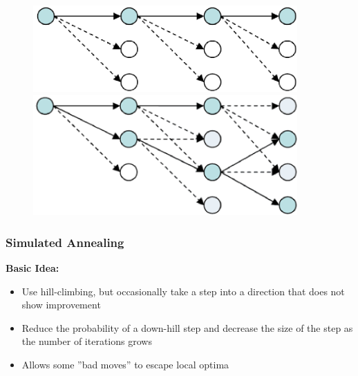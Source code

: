 \documentclass[
../../EiKI_Summary.tex,
]
{subfiles}
\begin{document}
\begin{figure}
    [H]    
    \begin{minipage}
        [t]{0.5\textwidth}
        \centering
        \includegraphics[valign=T,width=0.9\textwidth]{Pics/04/BeamSearchHillClimb.png}
    \end{minipage}
    \begin{minipage}
        [t]{0.5\textwidth}
        \centering
        \includegraphics[valign=T,width=0.9\textwidth]{Pics/04/BeamSearch.png}
    \end{minipage}
\end{figure}

\subsubsection{Simulated Annealing}
\textbf{Basic Idea:}
\begin{itemize}
    \item Use hill-climbing, but occasionally take a step into a direction that does not show improvement
    \item Reduce the probability of a down-hill step and decrease the size of the step as the number of iterations grows
    \item Allows some ''bad moves'' to escape local optima
\end{itemize}
\end{document}
